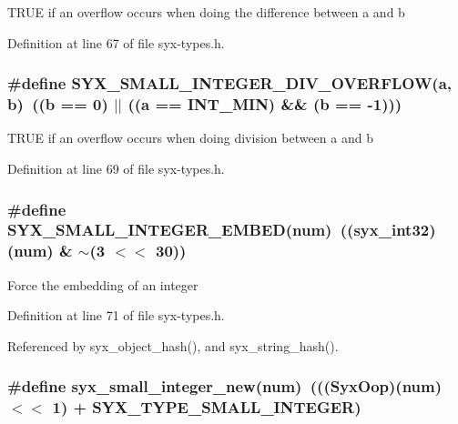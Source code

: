TRUE if an overflow occurs when doing the difference between a and b 

Definition at line 67 of file syx-types.h.\hypertarget{syx-types_8h_2677bd5120489b2e976f3977d7701f26}{
\subsubsection{\setlength{\rightskip}{0pt plus 5cm}\#define SYX\_\-SMALL\_\-INTEGER\_\-DIV\_\-OVERFLOW(a, \/  b)~((b == 0) $|$$|$ ((a == INT\_\-MIN) \&\& (b == -1)))}}
\label{syx-types_8h_2677bd5120489b2e976f3977d7701f26}


TRUE if an overflow occurs when doing division between a and b 

Definition at line 69 of file syx-types.h.\hypertarget{syx-types_8h_45b7f40283a751d5e2dcd24472168b9f}{
\subsubsection{\setlength{\rightskip}{0pt plus 5cm}\#define SYX\_\-SMALL\_\-INTEGER\_\-EMBED(num)~(({\bf syx\_\-int32})(num) \& $\sim$(3 $<$$<$ 30))}}
\label{syx-types_8h_45b7f40283a751d5e2dcd24472168b9f}


Force the embedding of an integer 

Definition at line 71 of file syx-types.h.

Referenced by syx\_\-object\_\-hash(), and syx\_\-string\_\-hash().\hypertarget{syx-types_8h_a374195520da5e9f09f3ba4cfacf66fc}{
\subsubsection{\setlength{\rightskip}{0pt plus 5cm}\#define syx\_\-small\_\-integer\_\-new(num)~((({\bf SyxOop})(num) $<$$<$ 1) + SYX\_\-TYPE\_\-SMALL\_\-INTEGER)}}
\label{syx-types_8h_a374195520da5e9f09f3ba4cfacf66fc}


